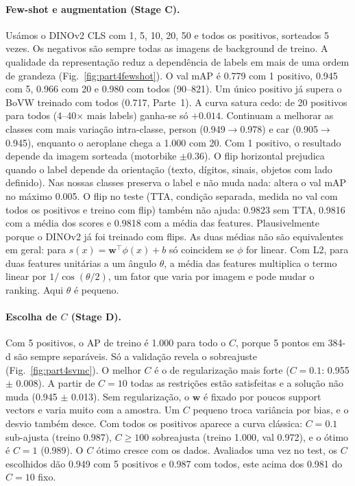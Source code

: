 \paragraph{Few-shot e augmentation (Stage C).}
Usámos o DINOv2 CLS com 1, 5, 10, 20, 50 e todos os positivos, sorteados 5
vezes. Os negativos são sempre todas as imagens de background de treino. A
qualidade da representação reduz a dependência de labels em mais de uma ordem
de grandeza (Fig.~\ref{fig:part4fewshot}). O val mAP é 0.779 com 1 positivo,
0.945 com 5, 0.966 com 20 e 0.980 com todos (90--821). Um único positivo já
supera o BoVW treinado com todos (0.717, Parte~1). A curva satura cedo: de 20
positivos para todos (4--40$\times$ mais labels) ganha-se só $+0.014$.
Continuam a melhorar as classes com mais variação intra-classe, person
(0.949$\to$0.978) e car (0.905$\to$0.945), enquanto o aeroplane chega a 1.000
com 20. Com 1 positivo, o resultado depende da imagem sorteada (motorbike
$\pm0.36$). O flip horizontal prejudica quando o label depende da orientação
(texto, dígitos, sinais, objetos com lado definido). Nas nossas classes
preserva o label e não muda nada: altera o val mAP no máximo 0.005. O flip no
teste (TTA, condição separada, medida no val com todos os positivos e treino
com flip) também não ajuda: 0.9823 sem TTA, 0.9816 com a média dos scores e
0.9818 com a média das features. Plausivelmente porque o DINOv2 já foi
treinado com flips. As duas médias não são equivalentes em geral: para
$s(x)=\mathbf{w}^\top\phi(x)+b$ só coincidem se $\phi$ for linear. Com L2,
para duas features unitárias a um ângulo $\theta$, a média das features
multiplica o termo linear por $1/\cos(\theta/2)$, um fator que varia por
imagem e pode mudar o ranking. Aqui $\theta$ é pequeno.

\paragraph{Escolha de $C$ (Stage D).}
Com 5 positivos, o AP de treino é 1.000 para todo o $C$, porque 5 pontos em
384-d são sempre separáveis. Só a validação revela o sobreajuste
(Fig.~\ref{fig:part4svmc}). O melhor $C$ é o de regularização mais forte
($C=0.1$: 0.955 $\pm$ 0.008). A partir de $C=10$ todas as restrições estão
satisfeitas e a solução não muda (0.945 $\pm$ 0.013). Sem regularização, o
$\mathbf{w}$ é fixado por poucos support vectors e varia muito com a amostra.
Um $C$ pequeno troca variância por bias, e o desvio também desce. Com todos os
positivos aparece a curva clássica: $C=0.1$ sub-ajusta (treino 0.987), $C\ge100$
sobreajusta (treino 1.000, val 0.972), e o ótimo é $C=1$ (0.989). O $C$ ótimo
cresce com os dados. Avaliados uma vez no test, os $C$ escolhidos dão 0.949 com 5
positivos e 0.987 com todos, este acima dos 0.981 do $C=10$ fixo.

